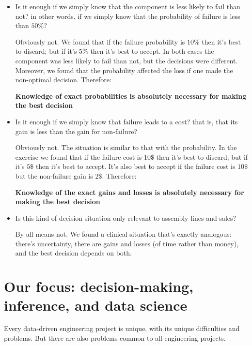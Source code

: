 \documentclass[
  a4paper,
  DIV=11,
  numbers=noendperiod,
  oneside]{scrreprt}
\begin{document}
\begin{itemize}
\item
  Is it enough if we simply know that the component is less likely to
  fail than not? in other words, if we simply know that the probability
  of failure is less than \(50\%\)?

  Obviously not. We found that if the failure probability is \(10\%\)
  then it's best to discard; but if it's \(5\%\) then it's best to
  accept. In both cases the component was less likely to fail than not,
  but the decisions were different. Moreover, we found that the
  probability affected the loss if one made the non-optimal decision.
  Therefore:

  {\textbf{Knowledge of exact probabilities is absolutely necessary for
  making the best decision}}
\item
  Is it enough if we simply know that failure leads to a cost? that is,
  that its gain is less than the gain for non-failure?

  Obviously not. The situation is similar to that with the probability.
  In the exercise we found that if the failure cost is \(10\$\) then
  it's best to discard; but if it's \(5\$\) then it's best to accept.
  It's also best to accept if the failure cost is \(10\$\) but the
  non-failure gain is \(2\$\). Therefore:

  {\textbf{Knowledge of the exact gains and losses is absolutely
  necessary for making the best decision}}
\item
  Is this kind of decision situation only relevant to assembly lines and
  sales?

  By all means not. We found a clinical situation that's exactly
  analogous: there's uncertainty, there are gains and losses (of time
  rather than money), and the best decision depends on both.
\end{itemize}

\hypertarget{our-focus-decision-making-inference-and-data-science}{%
\section{Our focus: decision-making, inference, and data
science}\label{our-focus-decision-making-inference-and-data-science}}

Every data-driven engineering project is unique, with its unique
difficulties and problems. But there are also problems common to all
engineering projects.
\end{document}
